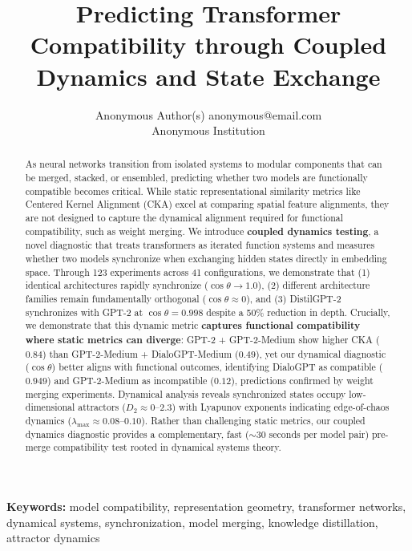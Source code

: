 \documentclass[10pt]{article} %
\title{Predicting Transformer Compatibility through Coupled Dynamics and State Exchange}
\author{\name Anonymous Author(s) \email anonymous@email.com \\
      \addr Anonymous Institution}
\theoremstyle{plain}
\theoremstyle{definition}
\theoremstyle{remark}
\begin{document}
\maketitle

\begin{abstract}
As neural networks transition from isolated systems to modular components that can be merged, stacked, or ensembled, predicting whether two models are functionally compatible becomes critical. While static representational similarity metrics like Centered Kernel Alignment (CKA) excel at comparing spatial feature alignments, they are not designed to capture the dynamical alignment required for functional compatibility, such as weight merging. We introduce \textbf{coupled dynamics testing}, a novel diagnostic that treats transformers as iterated function systems and measures whether two models synchronize when exchanging hidden states directly in embedding space. Through 123 experiments across 41 configurations, we demonstrate that (1) identical architectures rapidly synchronize ($\cos \theta \to 1.0$), (2) different architecture families remain fundamentally orthogonal ($\cos \theta \approx 0$), and (3) DistilGPT-2 synchronizes with GPT-2 at $\cos \theta = 0.998$ despite a 50\% reduction in depth. Crucially, we demonstrate that this dynamic metric \textbf{captures functional compatibility where static metrics can diverge}: GPT-2 + GPT-2-Medium show higher CKA ($0.84$) than GPT-2-Medium + DialoGPT-Medium ($0.49$), yet our dynamical diagnostic ($\cos \theta$) better aligns with functional outcomes, identifying DialoGPT as compatible ($0.949$) and GPT-2-Medium as incompatible ($0.12$), predictions confirmed by weight merging experiments. Dynamical analysis reveals synchronized states occupy low-dimensional attractors ($D_2 \approx 0$--$2.3$) with Lyapunov exponents indicating edge-of-chaos dynamics ($\lambda_{\max} \approx 0.08$--$0.10$). Rather than challenging static metrics, our coupled dynamics diagnostic provides a complementary, fast ($\sim$30 seconds per model pair) pre-merge compatibility test rooted in dynamical systems theory.
\end{abstract}


\textbf{Keywords:} model compatibility, representation geometry, transformer networks, dynamical systems, synchronization, model merging, knowledge distillation, attractor dynamics
\end{document}
